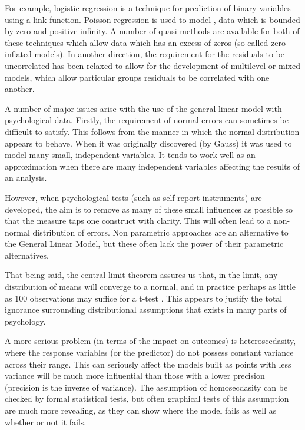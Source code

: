 For example, logistic regression is a technique for prediction of binary variables using a link function. Poisson regression is used to model , data which is bounded by zero and positive infinity. A number of quasi methods are available for both of these techniques which allow data which has an excess of zeros (so called zero inflated models)\cite{gelman2007data,venables2002modern}. In another direction, the requirement for the residuals to be uncorrelated has been relaxed to allow for the development of multilevel or mixed models, which allow particular groups residuals to be correlated with one another\cite{gelman2007data}. %

A number of major issues arise with the use of the general linear model with psychological data. Firstly, the requirement of normal errors can sometimes be difficult to satisfy. This follows from the manner in which the normal distribution appears to behave. When it was originally discovered (by Gauss) it was used to model many small, independent variables. It tends to work well as an approximation when there are many independent variables affecting the results of an analysis. 

However, when psychological tests (such as self report instruments) are developed, the aim is to remove as many of these small influences as possible so that the measure taps one construct with clarity. This will often lead to a non-normal distribution of errors. Non parametric approaches are an alternative to the General Linear Model, but these often lack the power of their parametric alternatives. 

That being said, the central limit theorem assures us that, in the limit, any distribution of means will converge to a normal, and in practice perhaps as little as 100 observations may suffice for a t-test \cite{venables2002modern}. This appears to justify the total ignorance surrounding distributional assumptions that exists in many parts of psychology. 

A more serious problem (in terms of the impact on outcomes) is heteroscedasity, where the response variables (or the predictor) do not possess constant variance across their range\cite{gelman2007data}. This can seriously affect the models built as points with less variance will be much more influential than those with a lower precision (precision is the inverse of variance). The assumption of homosecdasity can be checked by formal statistical tests, but often graphical tests of this assumption are much more revealing, as they can show where the model fails as well as whether or not it fails. 

